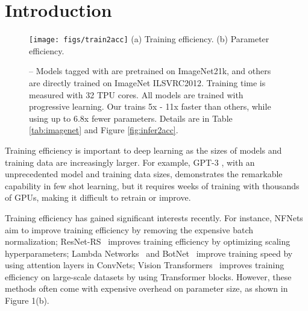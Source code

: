 \documentclass{article}
\begin{document}
\section{Introduction}

\begin{figure}[!t]
	\centering
	\texttt{[image: figs/train2acc]}
	\vskip -0.05in
    (a) Training efficiency.
	\vskip 0.1in
    (b) Parameter efficiency.
\caption{
		  -- Models tagged with  are pretrained on ImageNet21k, and others are directly trained on ImageNet ILSVRC2012. Training time is measured with 32 TPU cores.
All {\xnet} models are trained with progressive learning.
		Our {\xnet} trains 5x - 11x faster than others, while using up to 6.8x fewer parameters.
Details are in Table \ref{tab:imagenet} and Figure \ref{fig:infer2acc}.
    }
	\label{fig:train2acc}
	\vskip -0.1in
\end{figure}
 Training efficiency is important to deep learning as the sizes of models and training data are increasingly larger. For example, GPT-3 \cite{gpt320},  with an unprecedented  model and training data sizes,  demonstrates the remarkable capability in few shot learning,
but it requires weeks of training with thousands of GPUs, making it  difficult  to retrain or improve. 

Training efficiency has gained significant interests recently. For instance, NFNets~\cite{nfnet21} aim to improve training efficiency by removing the expensive batch normalization; ResNet-RS~\cite{resnetrs21} improves training efficiency by optimizing scaling hyperparameters; Lambda Networks~\cite{lambdanet21} and BotNet~\cite{botnet21} improve training speed by using attention layers in ConvNets; Vision Transformers~\cite{vit21} improves training efficiency on large-scale datasets by using Transformer blocks. However, these methods often come with expensive overhead on parameter size, as shown in Figure 1(b).
\end{document}
